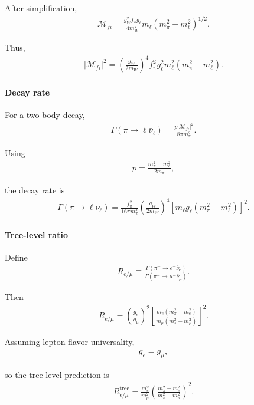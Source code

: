 After simplification,
\begin{align}
\mathcal{M}_{fi}
=
\frac{g_W^2 f_\pi g_\ell}{4m_W^2}
m_\ell
\left(m_\pi^2-m_\ell^2\right)^{1/2}.
\end{align}

Thus,
\begin{align}
|\mathcal{M}_{fi}|^2
=
\left(
\frac{g_W}{2m_W}
\right)^4
f_\pi^2 g_\ell^2
m_\ell^2
\left(m_\pi^2-m_\ell^2\right).
\end{align}

\paragraph{Decay rate}

For a two-body decay,
\begin{align}
\Gamma(\pi \to \ell \bar{\nu}_\ell)
=
\frac{p|\mathcal{M}_{fi}|^2}{8\pi m_\pi^2}.
\end{align}

Using
\begin{align}
p
=
\frac{m_\pi^2-m_\ell^2}{2m_\pi},
\end{align}

the decay rate is
\begin{align}
\Gamma(\pi \to \ell \bar{\nu}_\ell)
=
\frac{f_\pi^2}{16\pi m_\pi^3}
\left(
\frac{g_W}{2m_W}
\right)^4
\left[
m_\ell g_\ell
\left(m_\pi^2-m_\ell^2\right)
\right]^2 .
\end{align}

\paragraph{Tree-level ratio}

Define
\begin{align}
R_{e/\mu}
\equiv
\frac{
\Gamma(\pi^- \to e^- \bar{\nu}_e)
}{
\Gamma(\pi^- \to \mu^- \bar{\nu}_\mu)
}.
\end{align}

Then
\begin{align}
R_{e/\mu}
=
\left(
\frac{g_e}{g_\mu}
\right)^2
\left[
\frac{
m_e(m_\pi^2-m_e^2)
}{
m_\mu(m_\pi^2-m_\mu^2)
}
\right]^2 .
\end{align}

Assuming lepton flavor universality,
\begin{align}
g_e = g_\mu ,
\end{align}

so the tree-level prediction is
\begin{align}
R_{e/\mu}^{\mathrm{tree}}
=
\frac{m_e^2}{m_\mu^2}
\left(
\frac{m_\pi^2-m_e^2}
     {m_\pi^2-m_\mu^2}
\right)^2 .
\end{align}
